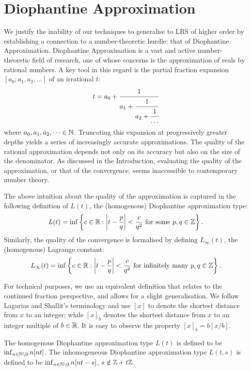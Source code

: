 \section{Diophantine Approximation}
\label{section:diophantine}
We justify the inability of our techniques to generalise to LRS of higher order by establishing a connection to a number-theoretic hurdle: that of Diophantine Approximation. Diophantine Approximation is a vast and active number-theoretic field of research, one of whose concerns is the approximation of reals by rational numbers. A key tool in this regard is the partial fraction expansion $[a_0; a_1, a_2, \dots]$ of an irrational $t$:
$$
t = a_0 + \cfrac{1}{a_1 + \cfrac{1}{a_2 + \cfrac{1}{\dots}}}
$$
where $a_0, a_1, a_2, \dots \in \mathbb{N}$. Truncating this expansion at progressively greater depths yields a series of increasingly accurate approximations. The quality of the rational approximation depends not only on its accuracy but also on the size of the denominator. As discussed in the Introduction, evaluating the quality of the approximation, or that of the convergence, seems inaccessible to contemporary number theory.

The above intuition about the quality of the approximation is captured in the following definition of $L(t)$, the (homogenous) Diophantine approximation type:
\begin{equation}
L(t) = \inf\left\{c \in \mathbb{R} : \left|t - \frac{p}{q}\right| < \frac{c}{q^2} \text{ for some } p, q\in \mathbb{Z}\right\}.
\end{equation}
Similarly, the quality of the convergence is formalised by defining $L_{\infty}(t)$, the (homogenous) Lagrange constant: 
\begin{equation}
L_\infty(t) = \inf\left\{c \in \mathbb{R} : \left|t - \frac{p}{q}\right| < \frac{c}{q^2} \text{ for infinitely many } p, q\in \mathbb{Z}\right\}.
\end{equation}
 
For technical purposes, we use an equivalent definition that relates to the continued fraction perspective, and allows for a slight generalisation. We follow Lagarias and Shallit’s terminology \cite{dio-constants} and use $[x]$ to denote the shortest distance from $x$ to an integer; while $[x]_b$ denotes the shortest distance from $x$ to an integer multiple of $b \in \mathbb{R}$. It is easy to observe the property $[x]_b = b[x/b]$.

\begin{definition}
\label{def:L}
The homogenous Diophantine approximation type $L(t)$ is defined to be $\inf_{n \in \mathbb{N} \backslash{0}} n[nt]$. The inhomogeneous Diophantine approximation type $L(t, s)$ is defined to be $\inf_{n \in \mathbb{N} \backslash{0}} n[nt - s]$, $s \notin \mathbb{Z} + t\mathbb{Z}$. 
\end{definition} 

